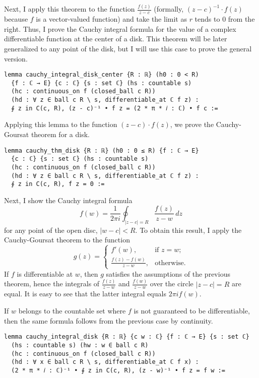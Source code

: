 \documentclass[a4paper, UKenglish,cleveref, autoref, thm-restate]{lipics-v2021}
\begin{document}
Next, I apply this theorem to the function \(\frac{f(z)}{z-c}\)
(formally, \((z-c)^{-1}\cdot f(z)\) because \(f\) is a vector-valued
function) and take the limit as \(r\) tends to \(0\) from the
right. Thus, I prove the Cauchy integral formula for the value of a
complex differentiable function at the center of a disk. This theorem
will be later generalized to any point of the disk, but I will use
this case to prove the general version.

\begin{lstlisting}[caption=Cauchy integral formula for the center of a disk,label=lst:cauchy-int-center]
lemma cauchy_integral_disk_center {R : ℝ} (h0 : 0 < R)
  {f : ℂ → E} {c : ℂ} {s : set ℂ} (hs : countable s)
  (hc : continuous_on f (closed_ball c R))
  (hd : ∀ z ∈ ball c R \ s, differentiable_at ℂ f z) :
  ∮ z in C(c, R), (z - c)⁻¹ • f z = (2 * π * 𝑖 : ℂ) • f c :=
\end{lstlisting}

Applying this lemma to the function \((z-c)\cdot f(z)\), we prove the
Cauchy-Goursat theorem for a disk.

\begin{lstlisting}[caption=The Cauchy-Goursat theorem for a disk,label=lst:cauchy-circle]
lemma cauchy_thm_disk {R : ℝ} (h0 : 0 ≤ R) {f : ℂ → E}
  {c : ℂ} {s : set ℂ} (hs : countable s)
  (hc : continuous_on f (closed_ball c R))
  (hd : ∀ z ∈ ball c R \ s, differentiable_at ℂ f z) :
  ∮ z in C(c, R), f z = 0 :=
\end{lstlisting}

Next, I show the Cauchy integral formula
\[
  f(w)=\frac{1}{2\pi i}\oint_{|z-c|=R}\frac{f(z)}{z-w}\,dz
\]
for any point of the open disc, \(|w-c|<R\). To obtain this result, I
apply the Cauchy-Goursat theorem to the function
\[
  g(z)=
  \begin{cases}
    f'(w),&\text{if }z=w;\\
    \frac{f(z)-f(w)}{z-w},&\text{otherwise}.
  \end{cases}
\]
If \(f\) is differentiable at \(w\), then \(g\) satisfies the
assumptions of the previous theorem, hence the integrals of
\(\frac{f(z)}{z-w}\) and \(\frac{f(w)}{z-w}\) over the circle
\(|z-c|=R\) are equal. It is easy to see that the latter integral
equals \(2\pi i f(w)\).

If \(w\) belongs to the countable set where \(f\) is not guaranteed to
be differentiable, then the same formula follows from the previous case by
continuity.

\begin{lstlisting}[caption=Cauchy integral formula for a circle,label=lst:cauchy-int]
lemma cauchy_integral_disk {R : ℝ} {c w : ℂ} {f : ℂ → E} {s : set ℂ}
  (hs : countable s) (hw : w ∈ ball c R)
  (hc : continuous_on f (closed_ball c R))
  (hd : ∀ x ∈ ball c R \ s, differentiable_at ℂ f x) :
  (2 * π * 𝑖 : ℂ)⁻¹ • ∮ z in C(c, R), (z - w)⁻¹ • f z = f w :=
\end{lstlisting}
\end{document}
